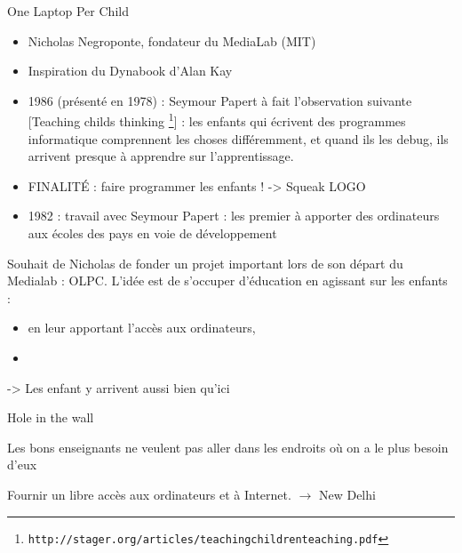 \begin{frame}{One Laptop Per Child}
  \begin{itemize}
   \item Nicholas  Negroponte, fondateur du MediaLab (MIT)
   \item Inspiration du Dynabook d'Alan Kay
   \item 1986 (présenté en 1978) : Seymour Papert à fait l'observation suivante [Teaching childs thinking \footnote{\texttt{http://stager.org/articles/teachingchildrenteaching.pdf}}] : les enfants qui écrivent des programmes informatique comprennent les choses différemment, et quand ils les debug, ils arrivent presque à apprendre sur l'apprentissage.
   \item FINALITÉ : faire programmer les enfants ! -> Squeak LOGO 
   \item 1982 : travail avec Seymour Papert : les premier à apporter des ordinateurs aux écoles des pays en voie de développement
  \end{itemize}
  Souhait de Nicholas de fonder un projet important lors de son départ du Medialab : OLPC. L'idée est de s'occuper d'éducation en agissant sur les enfants :
  \begin{itemize}
  \item en leur apportant l'accès aux ordinateurs,
  \item 
  \end{itemize}
  -> Les enfant y arrivent aussi bien qu'ici
\end{frame}

\begin{frame}
    \pause
    \begin{block}{Hole in the wall}
    \begin{coolquote}
    Les bons enseignants ne veulent pas aller dans les endroits où on a le plus besoin d'eux
    \end{coolquote}
    
      Fournir un libre accès aux ordinateurs et à Internet.
       $\rightarrow$ New Delhi
    \end{block}
\end{frame}

